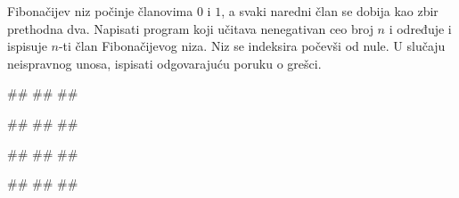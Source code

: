 \begin{Exercise}[label=PET_31] 
Fibonačijev niz počinje članovima $0$ i $1$, a svaki naredni član se dobija
kao zbir prethodna dva. Napisati program koji učitava nenegativan ceo broj
$n$ i određuje i ispisuje $n$-ti član Fibonačijevog niza. Niz se indeksira
počevši od nule.
U slučaju neispravnog unosa, ispisati odgovarajuću poruku o grešci.

\begin{miditest}
\begin{upotreba}{1}
#\naslovInt#
##
##
\end{upotreba}
\end{miditest}
\begin{miditest}
\begin{upotreba}{2}
#\naslovInt#
##
##
\end{upotreba}
\end{miditest}

\begin{miditest}
\begin{upotreba}{3}
#\naslovInt#
##
##
\end{upotreba}
\end{miditest}
\begin{miditest}
\begin{upotreba}{4}
#\naslovInt#
##
##
\end{upotreba}
\end{miditest}

\end{Exercise}
\ifresenja
\begin{Answer}[ref=PET_31]
\end{Answer}
\fi


